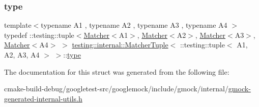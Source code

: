 \subsubsection{\texorpdfstring{type}{type}}
{\footnotesize\ttfamily template$<$typename A1 , typename A2 , typename A3 , typename A4 $>$ \\
typedef \+::testing\+::tuple$<$\mbox{\hyperlink{classtesting_1_1Matcher}{Matcher}}$<$A1$>$, \mbox{\hyperlink{classtesting_1_1Matcher}{Matcher}}$<$A2$>$, \mbox{\hyperlink{classtesting_1_1Matcher}{Matcher}}$<$A3$>$, \mbox{\hyperlink{classtesting_1_1Matcher}{Matcher}}$<$A4$>$ $>$ \mbox{\hyperlink{structtesting_1_1internal_1_1MatcherTuple}{testing\+::internal\+::\+Matcher\+Tuple}}$<$ \+::testing\+::tuple$<$ A1, A2, A3, A4 $>$ $>$\+::\mbox{\hyperlink{structtesting_1_1internal_1_1MatcherTuple_3_01_1_1testing_1_1tuple_3_01A1_00_01A2_00_01A3_00_01A4_01_4_01_4_afa578cadfc6b4725920b115d4f7633df}{type}}}



The documentation for this struct was generated from the following file\+:\begin{DoxyCompactItemize}
\item 
cmake-\/build-\/debug/googletest-\/src/googlemock/include/gmock/internal/\mbox{\hyperlink{gmock-generated-internal-utils_8h}{gmock-\/generated-\/internal-\/utils.\+h}}\end{DoxyCompactItemize}
